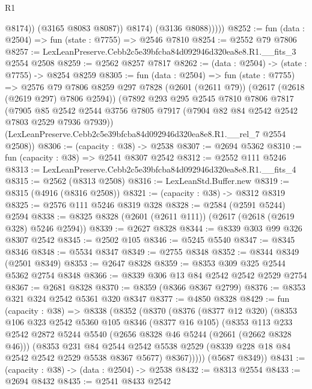 \begin{lexlean}{R1}
\begin{coremodule}
                    @8174))
                (@3165 @8083 @8087))
              @8174)
            (@3136 @8088)))))
@8252 := fun (data : @2504) => fun (state : @7755) => @2546 @7810
@8254 := @2552 @79 @7806
@8257 := LexLeanPreserve.Cebb2c5e39bfcba84d092946d320ea8e8.R1.__fits_3 @2554 @2508
@8259 := @2562 @8257 @7817
@8262 := (data : @2504) -> (state : @7755) -> @8254 @8259
@8305 := fun (data : @2504) =>
  fun (state : @7755) =>
  @2576
    @79
    @7806
    @8259
    @297
    @7828
    (@2601 (@2611 @79))
    (@2617 (@2618 (@2619 @297) @7806 @2594))
    (@7892
      @293
      @295
      @2545
      @7810
      @7806
      @7817
      (@7905 @85 @2542 @2544 @3756 @7805 @7917 (@7904 @82 @84 @2542 @2542 @7803 @2529 @7936 @7939))
      (LexLeanPreserve.Cebb2c5e39bfcba84d092946d320ea8e8.R1.__rel_7 @2554 @2508))
@8306 := (capacity : @38) -> @2538
@8307 := @2694 @5362
@8310 := fun (capacity : @38) => @2541 @8307 @2542
@8312 := @2552 @111 @5246
@8313 := LexLeanPreserve.Cebb2c5e39bfcba84d092946d320ea8e8.R1.__fits_4
@8315 := @2562 (@8313 @2508)
@8316 := LexLeanStd.Buffer.new
@8319 := @8315 (@4916 (@8316 @2508))
@8321 := (capacity : @38) -> @8312 @8319
@8325 := @2576 @111 @5246 @8319 @328
@8328 := @2584 (@2591 @5244) @2594
@8338 := @8325 @8328 (@2601 (@2611 @111)) (@2617 (@2618 (@2619 @328) @5246 @2594))
@8339 := @2627 @8328
@8344 := @8339 @303 @99 @326 @8307 @2542
@8345 := @2502 @105
@8346 := @5245 @5540
@8347 := @8345 @8346
@8348 := @5534 @8347
@8349 := @2755 @8348
@8352 := @8344 @8349 (@2501 @8349)
@8353 := @2647 @8328
@8359 := @8353 @309 @325 @2544 @5362 @2754 @8348
@8366 := @8339 @306 @13 @84 @2542 @2542 @2529 @2754
@8367 := @2681 @8328
@8370 := @8359 (@8366 @8367 @2799)
@8376 := @8353 @321 @324 @2542 @5361 @320 @8347
@8377 := @4850 @8328
@8429 := fun (capacity : @38) =>
  @8338
    (@8352
      (@8370
        (@8376
          (@8377 @12 @320)
          (@8353
            @106
            @323
            @2542
            @5360
            @105
            @8346
            (@8377 @16 @105)
            (@8353
              @113
              @233
              @2542
              @2872
              @5244
              @5540
              (@2656 @8328 @46 @5244 (@2661 (@2662 @8328 @46)))
              (@8353
                @231
                @84
                @2544
                @2542
                @5538
                @2529
                (@8339 @228 @18 @84 @2542 @2542 @2529 @5538 @8367 @5677)
                @8367)))))
      (@5687 @8349))
@8431 := (capacity : @38) -> (data : @2504) -> @2538
@8432 := @8313 @2554
@8433 := @2694 @8432
@8435 := @2541 @8433 @2542

\end{coremodule}
\end{lexlean}
